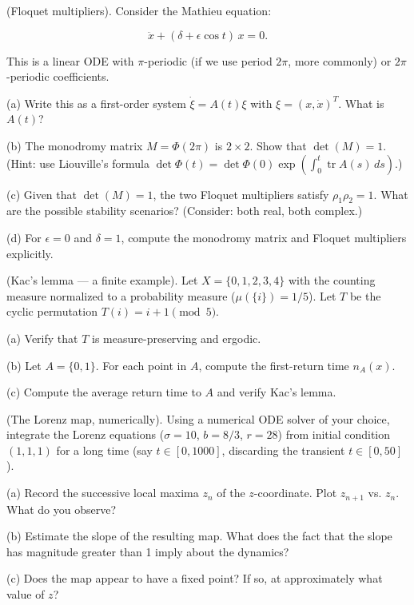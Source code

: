 \begin{exercise}
(Floquet multipliers). Consider the Mathieu equation:

\[
\ddot{x} + (\delta + \epsilon \cos t) \, x = 0.
\]

This is a linear ODE with $\pi$-periodic (if we use period $2\pi$, more commonly) or $2\pi$-periodic coefficients.

(a) Write this as a first-order system $\dot{\xi} = A(t)\xi$ with $\xi = (x, \dot{x})^T$. What is $A(t)$?

(b) The monodromy matrix $M = \Phi(2\pi)$ is $2 \times 2$. Show that $\det(M) = 1$. (Hint: use Liouville's formula $\det \Phi(t) = \det \Phi(0) \exp(\int_0^t \operatorname{tr} A(s) \, ds)$.)

(c) Given that $\det(M) = 1$, the two Floquet multipliers satisfy $\rho_1 \rho_2 = 1$. What are the possible stability scenarios? (Consider: both real, both complex.)

(d) For $\epsilon = 0$ and $\delta = 1$, compute the monodromy matrix and Floquet multipliers explicitly.
\end{exercise}


\begin{exercise}
(Kac's lemma --- a finite example). Let $X = \{0, 1, 2, 3, 4\}$ with the counting measure normalized to a probability measure ($\mu(\{i\}) = 1/5$). Let $T$ be the cyclic permutation $T(i) = i + 1 \pmod{5}$.

(a) Verify that $T$ is measure-preserving and ergodic.

(b) Let $A = \{0, 1\}$. For each point in $A$, compute the first-return time $n_A(x)$.

(c) Compute the average return time to $A$ and verify Kac's lemma.
\end{exercise}


\begin{exercise}
(The Lorenz map, numerically). Using a numerical ODE solver of your choice, integrate the Lorenz equations ($\sigma = 10$, $b = 8/3$, $r = 28$) from initial condition $(1, 1, 1)$ for a long time (say $t \in [0, 1000]$, discarding the transient $t \in [0, 50]$).

(a) Record the successive local maxima $z_n$ of the $z$-coordinate. Plot $z_{n+1}$ vs. $z_n$. What do you observe?

(b) Estimate the slope of the resulting map. What does the fact that the slope has magnitude greater than 1 imply about the dynamics?

(c) Does the map appear to have a fixed point? If so, at approximately what value of $z$?
\end{exercise}


